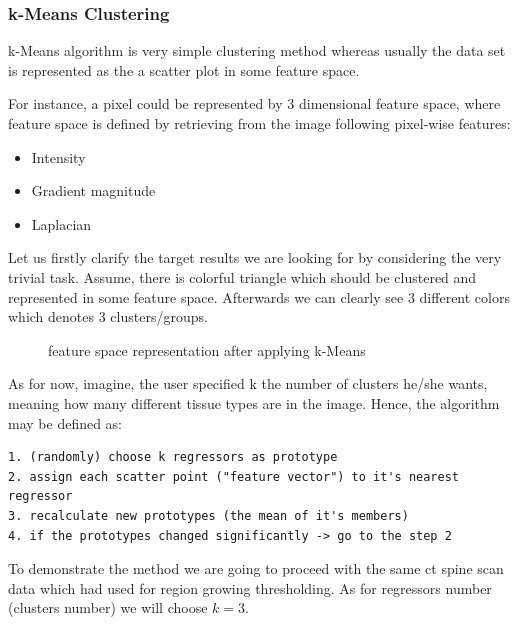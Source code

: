 \subsubsection{k-Means Clustering}
k-Means algorithm is very simple clustering method whereas usually the data set is represented as the a scatter plot in some feature space.

For instance, a pixel could be represented by 3 dimensional feature space, where feature space is defined by retrieving from the image following pixel-wise features:
\begin{itemize}
    \item Intensity
    \item Gradient magnitude
    \item Laplacian
\end{itemize}

Let us firstly clarify the target results we are looking for by considering the very trivial task.
Assume, there is colorful triangle which should be clustered and represented in some feature space. Afterwards we can clearly see 3 different colors which denotes 3 clusters/groups.
\begin{figure}[h]
    \centering
    \qquad
    \caption{feature space representation after applying k-Means}%
    \label{fig:grwoing_region}%
\end{figure}

As for now, imagine, the user specified k the number of clusters he/she wants, meaning how many different tissue types are in the image.
Hence, the algorithm may be defined as:
\begin{lstlisting}
1. (randomly) choose k regressors as prototype
2. assign each scatter point ("feature vector") to it's nearest regressor
3. recalculate new prototypes (the mean of it's members)
4. if the prototypes changed significantly -> go to the step 2 
\end{lstlisting}
To demonstrate the method we are going to proceed with the same ct spine scan data which had used for region growing thresholding. As for regressors number (clusters number) we will choose $k=3$.  

